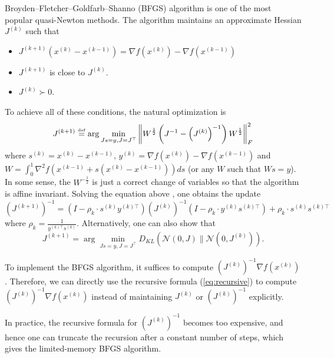 Broyden--Fletcher--Goldfarb--Shanno (BFGS) algorithm is one of
the most popular quasi-Newton methods. The algorithm maintains an
approximate Hessian $J^{(k)}$ such that
\begin{itemize}
\item $J^{(k+1)}(x^{(k)}-x^{(k-1)})=\nabla f(x^{(k)})-\nabla f(x^{(k-1)})$
\item $J^{(k+1)}$ is close to $J^{(k)}$.
\item $J^{(k)}\succ0$.
\end{itemize}
To achieve all of these conditions, the natural optimization is 
\[
J^{(k+1)}\stackrel{\mathrm{{\scriptscriptstyle def}}}{=}\arg\min_{Js=y,J=J^{\top}}\left\Vert W^{\frac{1}{2}}\left(J^{-1}-\left(J^{(k)}\right)^{-1}\right)W^{\frac{1}{2}}\right\Vert^{2}_{F}
\]
where $s^{(k)}=x^{(k)}-x^{(k-1)}$, $y^{(k)}=\nabla f(x^{(k)})-\nabla f(x^{(k-1)})$
and $W=\int^{1}_{0}\nabla^{2}f(x^{(k-1)}+s(x^{(k)}-x^{(k-1)}))ds$
(or any $W$ such that $Ws=y$). In some sense, the $W^{-\frac{1}{2}}$
is just a correct change of variables so that the algorithm is affine
invariant. Solving the equation above \cite{fletcher1987practical},
one obtains the update
\begin{equation}
\left(J^{(k+1)}\right)^{-1}=(I-\rho_{k}\cdot s^{(k)}y^{(k)\top})\left(J^{(k)}\right)^{-1}(I-\rho_{k}\cdot y^{(k)}s^{(k)\top})+\rho_{k}\cdot s^{(k)}s^{(k)\top}\label{eq:recursive}
\end{equation}
where $\rho_{k}=\frac{1}{y^{(k)\top}s^{(k)}}$. Alternatively, one
can also show that \cite{fletcher1991new}
\[
J^{(k+1)}=\arg\min_{Js=y,J=J^{\top}}D_{KL}(\mathcal{N}(0,J)\|\mathcal{N}(0,J^{(k)})).
\]

To implement the BFGS algorithm, it suffices to compute $\left(J^{(k)}\right)^{-1}\nabla f(x^{(k)})$.
Therefore, we can directly use the recursive formula (\ref{eq:recursive})
to compute $\left(J^{(k)}\right)^{-1}\nabla f(x^{(k)})$ instead of
maintaining $J^{(k)}$ or $\left(J^{(k)}\right)^{-1}$ explicitly.

In practice, the recursive formula for $\left(J^{(k)}\right)^{-1}$
becomes too expensive, and hence one can truncate the recursion after
a constant number of steps, which gives the limited-memory BFGS algorithm.

\subsection*{}
